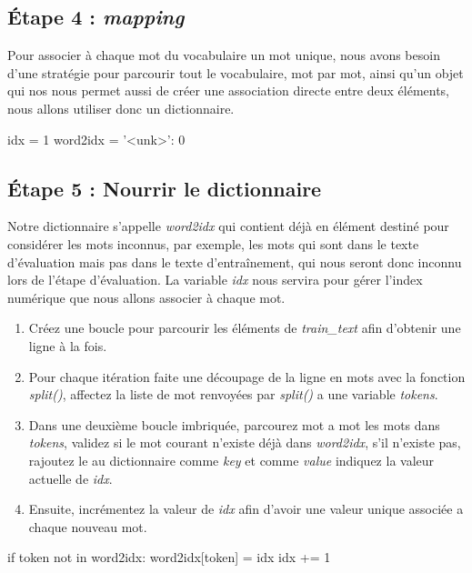 \subsection{Étape 4 : \textit{mapping}}

Pour associer à chaque mot du vocabulaire un mot unique, nous avons besoin d'une stratégie pour parcourir tout le vocabulaire, mot par mot, ainsi qu'un objet qui nos nous permet aussi de créer une association directe entre deux éléments, nous allons utiliser donc un dictionnaire.

\begin{python}
idx = 1
word2idx = {'<unk>': 0}
\end{python}

\subsection{Étape 5 : Nourrir le dictionnaire}
Notre dictionnaire s’appelle \textit{word2idx} qui contient déjà en élément destiné pour considérer les mots inconnus, par exemple, les mots qui sont dans le texte d'évaluation mais pas dans le texte d'entraînement, qui nous seront donc inconnu lors de l'étape d'évaluation. La variable \textit{idx} nous servira pour gérer l'index numérique que nous allons associer à chaque mot.

\begin{enumerate}
	\item Créez une boucle pour parcourir les éléments de \textit{train\_text} afin d'obtenir une ligne à la fois.
	\item Pour chaque itération faite une découpage de la ligne en mots avec la fonction \textit{split()}, affectez la liste de mot renvoyées par \textit{split()} a une variable \textit{tokens}.
	\item Dans une deuxième boucle imbriquée, parcourez mot a mot les mots dans \textit{tokens}, validez si le mot courant n'existe déjà dans \textit{word2idx}, s'il n'existe pas, rajoutez le au dictionnaire comme \textit{key} et comme \textit{value} indiquez la valeur actuelle de \textit{idx}.
	\item Ensuite, incrémentez la valeur de \textit{idx} afin d'avoir une valeur unique associée a chaque nouveau mot.
\end{enumerate}


\begin{python}
	if token not in word2idx:
	 word2idx[token] = idx
	 idx += 1
\end{python}


